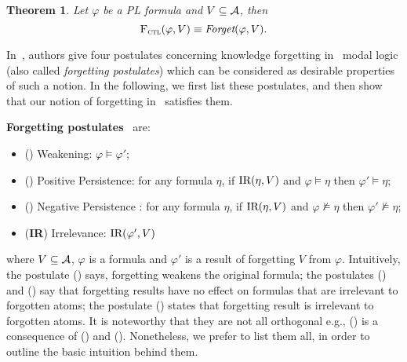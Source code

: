 \documentclass{article}
\newtheorem{theorem}{Theorem}
\begin{document}
\begin{theorem}\label{thm:PL:CTL}
Let $\varphi$ be a PL formula and $V\subseteq {\cal A}$, then
\[
{\textsc{F}_{\textsc{ctl}}}(\varphi, V) \equiv \textit{Forget}(\varphi, V).
\]
\end{theorem}

In~\cite{Yan:AIJ:2009}, authors give four postulates concerning knowledge forgetting in  \SFive\ modal logic (also called \emph{forgetting postulates}) which can be  considered as desirable properties of such a notion. In the following, we first list these postulates, and then show that our notion of forgetting in \CTL\ satisfies them.

\textbf{Forgetting postulates}~\cite{Yan:AIJ:2009} are:
\begin{itemize}
  \item[] (\W) Weakening: $\varphi \models \varphi'$;
  \item[] (\PP) Positive Persistence:
  for any formula $\eta$, if $\textrm{IR}(\eta, V)$ and $\varphi \models \eta$ then $\varphi' \models \eta$;
  \item[] (\NgP) Negative Persistence :  for any formula $\eta$,  if $\textrm{IR}(\eta, V)$ and $\varphi \not \models \eta$ then $\varphi' \not \models \eta$;
  \item[] (\textbf{IR}) Irrelevance: $\textrm{IR}(\varphi', V)$
\end{itemize}
where $V\subseteq\cal A$,
$\varphi$ is a formula and $\varphi'$ is a result of
forgetting $V$ from $\varphi$.
%
Intuitively, the postulate (\W) says, forgetting weakens the original formula; the postulates  (\PP) and (\NgP)
say that  forgetting results have no effect on formulas that are irrelevant to forgotten atoms; the postulate (\textbf{\IR}) states that
forgetting result is irrelevant to forgotten atoms.
It is noteworthy that they are not all orthogonal  e.g., (\NgP) is a consequence of (\W) and (\PP). Nonetheless, we prefer to list them all, in order to outline the basic intuition behind them.
\end{document}
